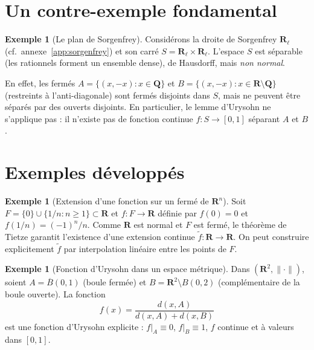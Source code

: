 \documentclass[12pt,a4paper,openany]{book}
\theoremstyle{definition}
\theoremstyle{cours}
\theoremstyle{coursnormal}
\newtheorem{exemple}[theoreme]{Exemple}
\begin{document}
\section{Un contre-exemple fondamental}
\label{sec:contre-exemple-non-normal}

\begin{exemple}[Le plan de Sorgenfrey]
\label{ex:plan-sorgenfrey-non-normal}
Considérons la droite de Sorgenfrey $\mathbf{R}_\ell$
(cf.\ annexe~\ref{app:sorgenfrey}) et son carré
$S=\mathbf{R}_\ell\times\mathbf{R}_\ell$.
L'espace $S$ est séparable (les rationnels forment un ensemble dense),
de Hausdorff, mais \emph{non normal}.

En effet, les fermés $A=\{(x,-x):x\in\mathbf{Q}\}$ et
$B=\{(x,-x):x\in\mathbf{R}\setminus\mathbf{Q}\}$ (restreints à
l'anti-diagonale) sont fermés disjoints dans $S$, mais ne peuvent
être séparés par des ouverts disjoints. En particulier, le lemme
d'Urysohn ne s'applique pas : il n'existe pas de fonction continue
$f\colon S\to[0,1]$ séparant $A$ et $B$.
\end{exemple}

\section{Exemples développés}
\label{sec:urysohn-exemples}

\begin{exemple}[Extension d'une fonction sur un fermé de $\mathbf{R}^n$]
\label{ex:extension-Rn}
Soit $F=\{0\}\cup\{1/n:n\ge 1\}\subset\mathbf{R}$ et $f\colon F\to
\mathbf{R}$ définie par $f(0)=0$ et $f(1/n)=(-1)^n/n$. Comme
$\mathbf{R}$ est normal et $F$ est fermé, le théorème de Tietze garantit
l'existence d'une extension continue $\tilde{f}\colon\mathbf{R}\to
\mathbf{R}$. On peut construire explicitement $\tilde{f}$ par
interpolation linéaire entre les points de $F$.
\end{exemple}

\begin{exemple}[Fonction d'Urysohn dans un espace métrique]
\label{ex:urysohn-metrique}
Dans $(\mathbf{R}^2,\|\cdot\|)$, soient $A=\overline{B}(0,1)$
(boule fermée) et $B=\mathbf{R}^2\setminus B(0,2)$ (complémentaire
de la boule ouverte). La fonction
\[
f(x)=\frac{d(x,A)}{d(x,A)+d(x,B)}
\]
est une fonction d'Urysohn explicite : $f|_A\equiv 0$, $f|_B\equiv 1$,
$f$ continue et à valeurs dans $[0,1]$.
\end{exemple}
\end{document}
